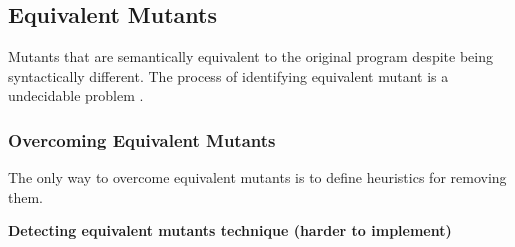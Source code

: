 
\subsection{Equivalent Mutants}
\label{sub:equivalent}

Mutants that are semantically equivalent to the original program despite being syntactically different. The process of identifying equivalent mutant is a undecidable problem \cite{madeyski2013overcoming}.

\subsubsection{Overcoming Equivalent Mutants} %
\label{sub:overcoming_equivalent_mutants}

The only way to overcome equivalent mutants is to define heuristics for removing them.

\textbf{Detecting equivalent mutants technique (harder to implement)}

